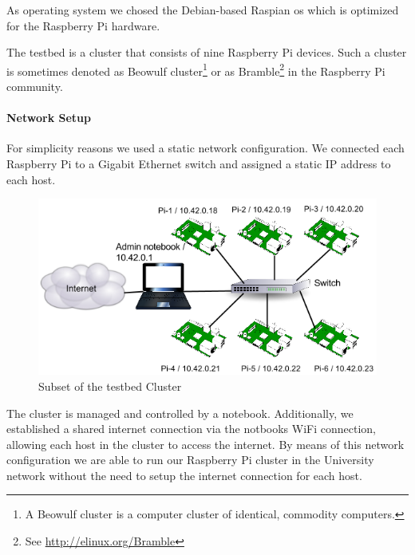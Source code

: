 \documentclass[10pt,a4paper]{article}
\begin{document}
As operating system we chosed the Debian-based Raspian os which is optimized for the Raspberry Pi hardware.


The testbed is a cluster that consists of nine Raspberry Pi devices. Such a cluster is sometimes denoted as Beowulf cluster\footnote{A Beowulf cluster is a computer cluster of identical, commodity computers.} or as Bramble\footnote{See \url{http://elinux.org/Bramble}} in the Raspberry Pi community.


\paragraph{Network Setup}
For simplicity reasons we used a static network configuration. We connected each Raspberry Pi to a Gigabit Ethernet switch and assigned a static IP address to each host. 

\begin{figure}[!htb]
\includegraphics[scale=0.45]{png/pi_cluster.png} 
\centering
\caption{Subset of the testbed Cluster}
\end{figure}

The cluster is managed and controlled by a notebook. Additionally, we established a shared internet connection via the notbooks WiFi connection, allowing each host in the cluster to access the internet. 
By means of this network configuration we are able to run our Raspberry Pi cluster in the University network without the need to setup the internet connection for each host.
\end{document}
